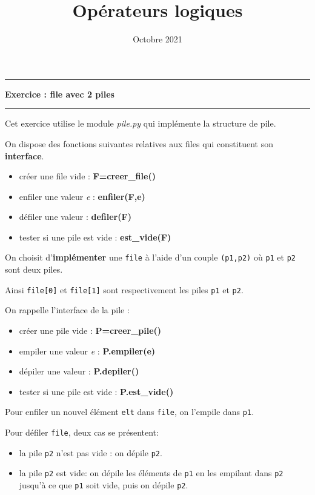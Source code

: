 \documentclass[11pt]{article}
\title{Opérateurs logiques}
\date{Octobre 2021}
\makeatletter
\providecommand{\tightlist}{%
      \setlength{\itemsep}{0pt}\setlength{\parskip}{0pt}}
\renewcommand\maketitle[1]{
\hrule\medskip
{\raggedright %
\begin{center}
{\Huge \bfseries \sffamily #1 }\\[4ex] 
\hrule \bigskip
\end{center}}} %
\makeatother
\begin{document}
    
    \maketitle{Exercice : file avec 2 piles}
    


Cet exercice utilise le module \emph{pile.py} qui implémente la
structure de pile.

On dispose des fonctions suivantes relatives aux files qui constituent
son \textbf{interface}.

\begin{itemize}
\tightlist
\item
  créer une file vide : \textbf{F=creer\_file()}
\item
  enfiler une valeur \emph{e} : \textbf{enfiler(F,e)}
\item
  défiler une valeur : \textbf{defiler(F)}
\item
  tester si une pile est vide : \textbf{est\_vide(F)}
\end{itemize}

On choisit d'\textbf{implémenter} une \texttt{file} à l'aide d'un couple
\texttt{(p1,p2)} où \texttt{p1} et \texttt{p2} sont deux piles.

Ainsi \texttt{file{[}0{]}} et \texttt{file{[}1{]}} sont respectivement
les piles \texttt{p1} et \texttt{p2}.

On rappelle l'interface de la pile :

\begin{itemize}
\tightlist
\item
  créer une pile vide : \textbf{P=creer\_pile()}
\item
  empiler une valeur \emph{e} : \textbf{P.empiler(e)}
\item
  dépiler une valeur : \textbf{P.depiler()}
\item
  tester si une pile est vide : \textbf{P.est\_vide()}
\end{itemize}

Pour enfiler un nouvel élément \texttt{elt} dans \texttt{file}, on
l'empile dans \texttt{p1}.

Pour défiler \texttt{file}, deux cas se présentent:

\begin{itemize}
\tightlist
\item
  la pile \texttt{p2} n'est pas vide : on dépile \texttt{p2}.
\item
  la pile \texttt{p2} est vide: on dépile les éléments de \texttt{p1} en
  les empilant dans \texttt{p2} jusqu'à ce que \texttt{p1} soit vide,
  puis on dépile \texttt{p2}.
\end{itemize}
\end{document}

